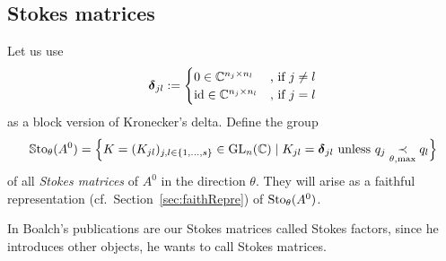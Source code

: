 \subsection{Stokes matrices}\label{sec:matrixReps}
\begin{defn}\label{defn:groupOfFaithfullReps}
  Let us use
  \[
    \boldsymbol{\delta}_{jl}:=
    \begin{cases}
      0 \in \mathbb{C}^{n_j\times n_l} & \text{,~if~} j\neq l
    \\\operatorname{id} \in \mathbb{C}^{n_j\times n_l} & \text{,~if~} j=l
    \end{cases}
  \]
  as a block version of Kronecker's delta.
  Define the group
  \begin{align*}
    \operatorname{\mathbb{S}to}_\theta(A^0)= \Big\{K=(K_{jl})_{j,l\in\{1,\dots,s\}}\in\operatorname{GL}_n(\mathbb{C}) \mid
      K_{jl}=\boldsymbol{\delta}_{jl} \text{~unless~}
      q_j \underset{\theta,\max}{\prec} q_l \Big\}
  \end{align*}
  of all \emph{Stokes matrices} of $A^0$ in the direction $\theta$.
  They will arise as a faithful representation
  (cf.\ Section~\ref{sec:faithRepre}) of $\operatorname{Sto}_\theta(A^0)$.
  \begin{s-rem}
    In Boalch's publications \cite{boalch,thboalch} are our Stokes matrices
    called Stokes factors, since he introduces other objects, he wants to call
    Stokes matrices.
  \end{s-rem}
\iffalse

\end{defn}
